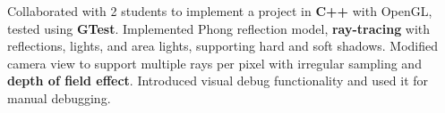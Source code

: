     \resumeItemListStart
        \subItemOfItem
        {Collaborated with 2 students to implement a project in \textbf{C++} with OpenGL, tested using \textbf{GTest}.}
        \subItemOfItem
        {Implemented Phong reflection model, \textbf{ray-tracing} with reflections, lights, and area lights, supporting hard and soft shadows.}
        \subItemOfItem
        {Modified camera view to support multiple rays per pixel with irregular sampling and \textbf{depth of field effect}.}
        \subItemOfItem
        {Introduced visual debug functionality and used it for manual debugging.}
    \resumeItemListEnd